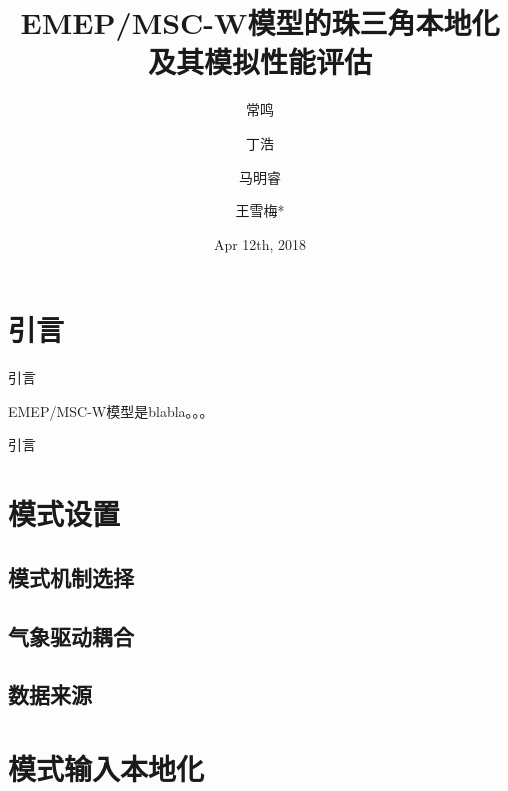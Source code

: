 \documentclass[14pt,hyperref={CJKbookmarks=true}]{beamer}
\begin{document}
\title{EMEP/MSC-W模型的珠三角本地化及其模拟性能评估}
\author[常鸣]{常鸣 \and 丁浩 \and 马明睿 \and 王雪梅*}
\date{Apr 12th, 2018}
\begin{frame}
\titlepage
\end{frame}
\tableofcontents
\section{引言}
\begin{frame}{引言}
\begin{EMEP/MSC-W模型简介}
EMEP/MSC-W模型是blabla。。。
\end{EMEP/MSC-W模型简介}
\end{frame}{引言}
\section{模式设置}
\subsection{模式机制选择}
\subsection{气象驱动耦合}
\subsection{数据来源}
\section{模式输入本地化}
\end{document}

